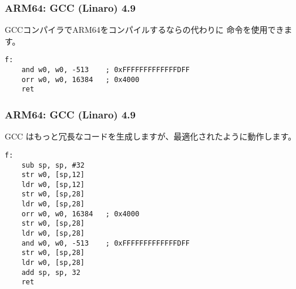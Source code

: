 \subsubsection{ARM64: \Optimizing GCC (Linaro) 4.9}

\Optimizing GCCコンパイラでARM64をコンパイルするならの代わりに \AND 命令を使用できます。

\begin{lstlisting}[caption=\Optimizing GCC (Linaro) 4.9,style=customasmARM]
f:
	and	w0, w0, -513	; 0xFFFFFFFFFFFFFDFF
	orr	w0, w0, 16384	; 0x4000
	ret
\end{lstlisting}

\subsubsection{ARM64: \NonOptimizing GCC (Linaro) 4.9}

\NonOptimizing GCC はもっと冗長なコードを生成しますが、最適化されたように動作します。

\begin{lstlisting}[caption=\NonOptimizing GCC (Linaro) 4.9,style=customasmARM]
f:
	sub	sp, sp, #32
	str	w0, [sp,12]
	ldr	w0, [sp,12]
	str	w0, [sp,28]
	ldr	w0, [sp,28]
	orr	w0, w0, 16384	; 0x4000
	str	w0, [sp,28]
	ldr	w0, [sp,28]
	and	w0, w0, -513	; 0xFFFFFFFFFFFFFDFF
	str	w0, [sp,28]
	ldr	w0, [sp,28]
	add	sp, sp, 32
	ret
\end{lstlisting}
